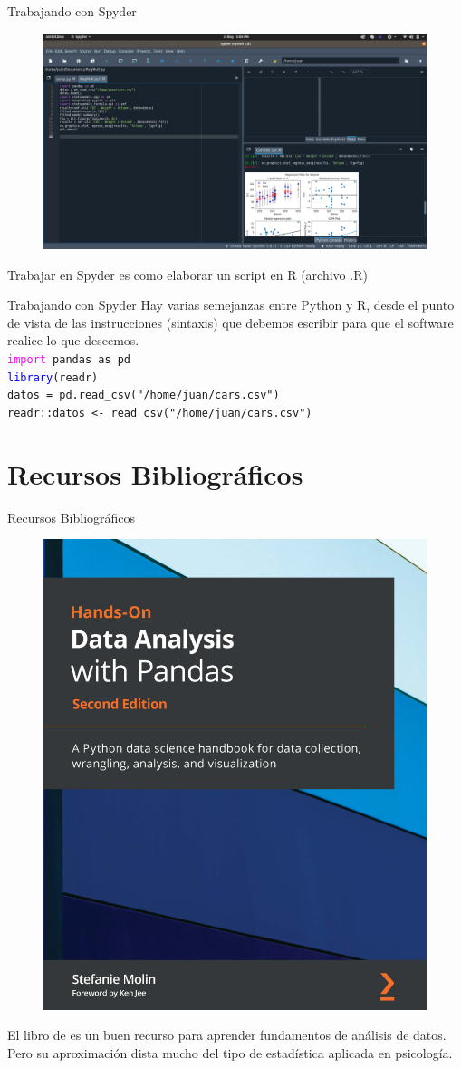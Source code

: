 \documentclass{beamer}
\begin{document}
\begin{frame}{Trabajando con Spyder}
\begin{figure}
\includegraphics[width=.9\textwidth]{spyder.png}
\end{figure}
Trabajar en Spyder es como elaborar un script en R (archivo .R)
\end{frame}


\begin{frame}{Trabajando con Spyder}
Hay varias semejanzas entre Python y R, desde el punto de vista de las instrucciones (sintaxis) que debemos escribir para que el software realice lo que deseemos.\\
\vspace{0.5cm}
\texttt{\textcolor{magenta}{import} pandas as pd} \\
\texttt{\textcolor{blue}{library}(readr)}\\
\vspace{0.5cm}
\texttt{datos = pd.read\_csv("/home/juan/cars.csv")} \\ \texttt{readr::datos <- read\_csv("/home/juan/cars.csv")}
\end{frame}

\section{Recursos Bibliográficos}
\begin{frame}{Recursos Bibliográficos}
\begin{figure}
\includegraphics[width=.3\textwidth]{book.png}
\end{figure}
El libro de \citeauthor{Molin2021} \citeyear{Molin2021} es un buen recurso para aprender fundamentos de análisis de datos. Pero su aproximación dista mucho del tipo de estadística aplicada en psicología.
\end{frame}
\end{document}
